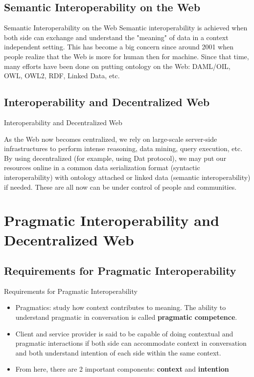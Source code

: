 \documentclass[10pt]{beamer}
\begin{document}
  \subsection{Semantic Interoperability on the Web}

    \begin{frame}[fragile]{Semantic Interoperability on the Web}
      Semantic interoperability is achieved when both side can exchange and understand the "meaning" of data in a context independent setting. This has become a big concern since around 2001 when people realize that the Web is more for human then for machine. Since that time, many efforts have been done on putting ontology on the Web: DAML/OIL, OWL, OWL2, RDF, Linked Data, etc. 
    \end{frame}

  \subsection{Interoperability and Decentralized Web}

    \begin{frame}[fragile]{Interoperability and Decentralized Web}

      As the Web now becomes centralized, we rely on large-scale server-side infrastructures to perform intense reasoning, data mining, query execution, etc. By using decentralized (for example, using Dat protocol), we may put our resources online in a common data serialization format (syntactic interoperability) with ontology attached or linked data (semantic interoperability) if needed. These are all now can be under control of people and communities.

    \end{frame}

\section{Pragmatic Interoperability and Decentralized Web}

  \subsection{Requirements for Pragmatic Interoperability}

    \begin{frame}[fragile]{Requirements for Pragmatic Interoperability}
      \begin{itemize}
        \item Pragmatics: study how context contributes to meaning. The ability to understand pragmatic in conversation is called \textbf{pragmatic competence}.
        \item Client and service provider is said to be capable of doing contextual and pragmatic interactions if both side can accommodate context in conversation and both understand intention of each side within the same context.
        \item From here, there are 2 important components: \textbf{context} and \textbf{intention}
      \end{itemize}
    \end{frame}
\end{document}
